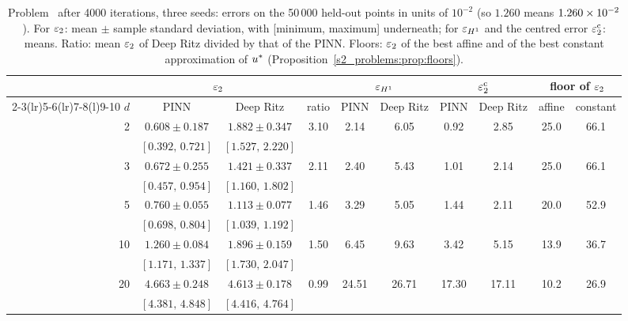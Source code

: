 \begin{table}[tbp]
\centering
\caption{Problem \Pone\ after 4000 iterations, three seeds: errors on the 50\,000 held-out
points in units of $10^{-2}$ (so $1.260$ means $1.260\times 10^{-2}$). For $\varepsilon_{2}$: mean
$\pm$ sample standard deviation, with [minimum, maximum] underneath; for $\varepsilon_{H^{1}}$ and the
centred error $\varepsilon_{2}^{\mathrm{c}}$: means. Ratio: mean $\varepsilon_{2}$ of Deep Ritz divided by that of the
PINN. Floors: $\varepsilon_{2}$ of the best affine and of the best constant approximation of $u^{*}$
(Proposition~\ref{s2_problems:prop:floors}).}
\label{s6_highdim:tab:p1}
\small
\setlength{\tabcolsep}{4.5pt}
\begin{tabular}{@{}r cc c cc cc cc@{}}
\toprule
 & \multicolumn{2}{c}{$\varepsilon_{2}$} & & \multicolumn{2}{c}{$\varepsilon_{H^{1}}$} & \multicolumn{2}{c}{$\varepsilon_{2}^{\mathrm{c}}$} & \multicolumn{2}{c}{floor of $\varepsilon_{2}$}\\
\cmidrule(lr){2-3}\cmidrule(lr){5-6}\cmidrule(lr){7-8}\cmidrule(l){9-10}
$d$ & PINN & Deep Ritz & ratio & PINN & Deep Ritz & PINN & Deep Ritz & affine & constant\\
\midrule
2 & $0.608\pm0.187$ & $1.882\pm0.347$ & 3.10 & 2.14 & 6.05 & 0.92 & 2.85 & 25.0 & 66.1 \\
 & {\footnotesize $[0.392,\,0.721]$} & {\footnotesize $[1.527,\,2.220]$} &  &  &  &  &  &  &  \\[2pt]
3 & $0.672\pm0.255$ & $1.421\pm0.337$ & 2.11 & 2.40 & 5.43 & 1.01 & 2.14 & 25.0 & 66.1 \\
 & {\footnotesize $[0.457,\,0.954]$} & {\footnotesize $[1.160,\,1.802]$} &  &  &  &  &  &  &  \\[2pt]
5 & $0.760\pm0.055$ & $1.113\pm0.077$ & 1.46 & 3.29 & 5.05 & 1.44 & 2.11 & 20.0 & 52.9 \\
 & {\footnotesize $[0.698,\,0.804]$} & {\footnotesize $[1.039,\,1.192]$} &  &  &  &  &  &  &  \\[2pt]
10 & $1.260\pm0.084$ & $1.896\pm0.159$ & 1.50 & 6.45 & 9.63 & 3.42 & 5.15 & 13.9 & 36.7 \\
 & {\footnotesize $[1.171,\,1.337]$} & {\footnotesize $[1.730,\,2.047]$} &  &  &  &  &  &  &  \\[2pt]
20 & $4.663\pm0.248$ & $4.613\pm0.178$ & 0.99 & 24.51 & 26.71 & 17.30 & 17.11 & 10.2 & 26.9 \\
 & {\footnotesize $[4.381,\,4.848]$} & {\footnotesize $[4.416,\,4.764]$} &  &  &  &  &  &  &  \\
\bottomrule
\end{tabular}
\end{table}

